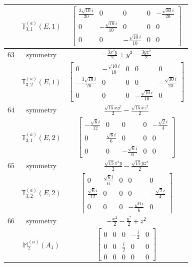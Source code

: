 \documentclass[fleqn,8pt,landscape]{jsarticle}
\begin{document}
\begin{longtable}{ccc}
$  $ & $ \mathbb{T}_{3,1}^{(a)}(E,1) $ & $ \begin{bmatrix} \frac{3 \sqrt{10} i}{20} & 0 & 0 & 0 & - \frac{\sqrt{30} i}{20} \\ 0 & - \frac{\sqrt{10} i}{10} & 0 & 0 & 0 \\ 0 & 0 & - \frac{\sqrt{10} i}{10} & 0 & 0 \end{bmatrix} $ \\ \hline
$ 63 $ & $ \text{symmetry} $ & $ - \frac{3 x^{2} y}{2} + y^{3} - \frac{3 y z^{2}}{2} $ \\
$  $ & $ \mathbb{T}_{3,2}^{(a)}(E,1) $ & $ \begin{bmatrix} 0 & - \frac{\sqrt{10} i}{10} & 0 & 0 & 0 \\ - \frac{3 \sqrt{10} i}{20} & 0 & 0 & 0 & - \frac{\sqrt{30} i}{20} \\ 0 & 0 & 0 & - \frac{\sqrt{10} i}{10} & 0 \end{bmatrix} $ \\ \hline
$ 64 $ & $ \text{symmetry} $ & $ \frac{\sqrt{15} x y^{2}}{2} - \frac{\sqrt{15} x z^{2}}{2} $ \\
$  $ & $ \mathbb{T}_{3,1}^{(a)}(E,2) $ & $ \begin{bmatrix} - \frac{\sqrt{6} i}{12} & 0 & 0 & 0 & - \frac{\sqrt{2} i}{4} \\ 0 & \frac{\sqrt{6} i}{6} & 0 & 0 & 0 \\ 0 & 0 & - \frac{\sqrt{6} i}{6} & 0 & 0 \end{bmatrix} $ \\ \hline
$ 65 $ & $ \text{symmetry} $ & $ \frac{\sqrt{15} x^{2} y}{2} - \frac{\sqrt{15} y z^{2}}{2} $ \\
$  $ & $ \mathbb{T}_{3,2}^{(a)}(E,2) $ & $ \begin{bmatrix} 0 & \frac{\sqrt{6} i}{6} & 0 & 0 & 0 \\ \frac{\sqrt{6} i}{12} & 0 & 0 & 0 & - \frac{\sqrt{2} i}{4} \\ 0 & 0 & 0 & - \frac{\sqrt{6} i}{6} & 0 \end{bmatrix} $ \\ \hline
$ 66 $ & $ \text{symmetry} $ & $ - \frac{x^{2}}{2} - \frac{y^{2}}{2} + z^{2} $ \\
$  $ & $ \mathbb{M}_{2}^{(a)}(A_{1}) $ & $ \begin{bmatrix} 0 & 0 & 0 & - \frac{i}{2} & 0 \\ 0 & 0 & \frac{i}{2} & 0 & 0 \\ 0 & 0 & 0 & 0 & 0 \end{bmatrix} $ \\ \hline

\end{longtable}
\end{document}
